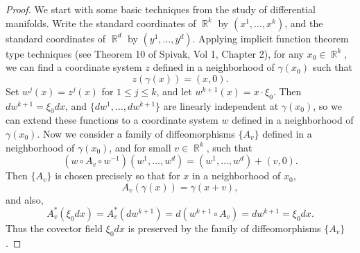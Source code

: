 \documentclass[dvipsnames,letterpaper,12pt]{article}
\DeclareMathOperator{\RR}{\mathbb{R}}
\begin{document}
\begin{proof}
    We start with some basic techniques from the study of differential manifolds. Write the standard coordinates of $\RR^k$ by $(x^1,\dots,x^k)$, and the standard coordinates of $\RR^d$ by $(y^1,\dots,y^d)$. Applying implicit function theorem type techniques (see Theorem 10 of Spivak, Vol 1, Chapter 2), for any $x_0 \in \RR^k$, we can find a coordinate system $z$ defined in a neighborhood of $\gamma(x_0)$ such that
    \[ z(\gamma(x)) = (x,0). \]
    Set $w^j(x) = z^j(x)$ for $1 \leq j \leq k$, and let $w^{k+1}(x) = x \cdot \xi_0$. Then $dw^{k+1} = \xi_0 dx$, and $\{ dw^1,\dots, dw^{k+1} \}$ are linearly independent at $\gamma(x_0)$, so we can extend these functions to a coordinate system $w$ defined in a neighborhood of $\gamma(x_0)$. Now we consider a family of diffeomorphisms $\{ A_v \}$ defined in a neighborhood of $\gamma(x_0)$, and for small $v \in \RR^k$, such that
    \[ (w \circ A_v \circ w^{-1})(w^1,\dots,w^d) = (w^1,\dots,w^d) + (v, 0). \]
    Then $\{ A_v \}$ is chosen precisely so that for $x$ in a neighborhood of $x_0$,
    \[ A_v(\gamma(x)) = \gamma(x + v), \]
    and also,
    \[ A_v^*( \xi_0 dx ) = A_v^*( dw^{k+1} ) = d( w^{k+1} \circ A_v ) = d w^{k+1} = \xi_0 dx. \]
    Thus the covector field $\xi_0 dx$ is preserved by the family of diffeomorphisms $\{ A_v \}$.

    


    \begin{comment}


    Fix $\delta > 0$ such that for $v \in \RR^k$ with $|v| \leq \delta$,
    \[ v + Q \subset 1.5\; Q. \]
    We can then find an open set $W$, compactly contained in $V$, such that $F(W) + (v,0) \subset V$ for all $v \in \RR^k$ with $|v| \leq \delta$. We can now consider the smooth family of diffeomorphisms $A_v: W \to \RR^d$ for each $v \in \RR^k$ with $|v| \leq \delta$ given by
    \[ A_v(x) = F^{-1} \Big( F(y) + (v, 0) \Big). \]
    These diffeomorphisms are constructed precisely so that they have the property that for $x \in Q$,
    \[ \gamma(x + v) = A_v(\gamma(x)). \]
    Consider a smooth, non-negative bump function $\psi$ on $\RR^d$, which is equal to one on a neighborhood of $\gamma(Q)$. For $|v| \leq \delta$, consider the measure $\mu_v = \text{Trans}_v \mu$. We calculate using the multiplication formula for the Fourier transform that
    \begin{align*}
        \widehat{\gamma_* \mu_v}(\xi) &= \int_U e^{2 \pi i \xi \cdot \gamma(x + v)}\; d \mu(x)\\
        &= \int_U e^{2 \pi i \xi \cdot A_v(\gamma(x))}\; d\mu(x)\\
        &= \int_{\RR^d_y} e^{2 \pi i \xi \cdot A_v(y)}\; d(\gamma_* \mu)(y)\\
        &= \int_{\RR^d_y} \psi(y) e^{2 \pi i \xi \cdot A_v(y)}\; d(\gamma_* \mu)(y)\\
        &= \int_{\RR^d_\xi} I_{v,\xi}(\eta) \widehat{\gamma_* \mu}(\eta)\; d\eta,
    \end{align*}


\end{comment}
\end{proof}
\end{document}
